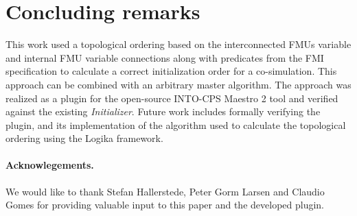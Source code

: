 \section{Concluding remarks}\label{sc:summary}
This work used a topological ordering based on the interconnected FMUs variable and internal FMU variable connections along with predicates from the FMI specification to calculate a correct initialization order for a co-simulation. This approach can be combined with an arbitrary master algorithm. 
The approach was realized as a plugin for the open-source INTO-CPS Maestro 2 tool and verified against the existing \textit{Initializer}.
Future work includes formally verifying the plugin, and its implementation of the algorithm used to calculate the topological ordering using the Logika framework.

\paragraph*{\textbf{Acknowlegements.}}We would like to thank Stefan Hallerstede, Peter Gorm Larsen and Claudio Gomes for providing valuable input to this paper and the developed plugin.